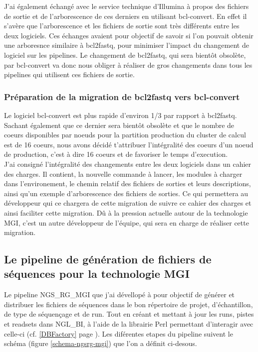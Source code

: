J'ai également échangé avec le service technique d'Illumina à propos des fichiers de sortie et de l'arborescence de ces derniers en utilisant bcl-convert. En effet il s'avère que l'arborescence et les fichiers de sortie sont très différents entre les deux logiciels. Ces échanges avaient pour objectif de savoir si l'on pouvait obtenir une arboresnce similaire à bcl2fastq, pour minimiser l'impact du changement de logiciel sur les pipelines. Le changement de bcl2fastq, qui sera bientôt obsolète, par bcl-convert va donc nous obliger à réaliser de gros changements dans tous les pipelines qui utilisent ces fichiers de sortie.

\subsubsection*{Préparation de la migration de bcl2fastq vers bcl-convert}
Le logiciel bcl-convert est plus rapide d'environ 1/3 par rapport à bcl2fastq. Sachant également que ce dernier sera bientôt obsolète et que le nombre de coeurs disponibles par noeuds pour la partition \og production\fg{} du cluster de calcul est de 16 coeurs, nous avons décidé t'attribuer l'intégralité des coeurs d'un noeud de \og production\fg{}, c'est à dire 16 coeurs et de favoriser le temps d'execution.\\

J'ai consigné l'intégralité des changements entre les deux logiciels dans un cahier des charges. Il contient, la nouvelle commande à lancer, les modules à charger dans l'environement, le chemin relatif des fichiers de sorties et leurs descriptions, ainsi qu'un exemple d'arborescence des fichiers de sorties. Ce qui permettera au développeur qui ce chargera de cette migration de suivre ce cahier des charges et ainsi faciliter cette migration. Dû à la pression actuelle autour de la technologie MGI, c'est un autre développeur de l'équipe, qui sera en charge de réaliser cette migration.


\subsection{Le pipeline de génération de fichiers de séquences pour la technologie MGI}
Le pipeline NGS\_RG\_MGI que j'ai dévellopé à pour objectif de générer et distribuer les fichiers de séquences dans le bon répertoire de projet, d'échantillon, de type de séquençage et de run.
Tout en créant et mettant à jour les runs, pistes et readsets dans NGL\_BI, à l'aide de la librairie Perl permettant d'interagir avec celle-ci (cf. \ref{DBFactory} page \pageref{DBFactory}). Les diférentes etapes du pipeline suivent le schéma (figure \ref{schema-ngsrg-mgi}) que l'on a définit ci-desous.

